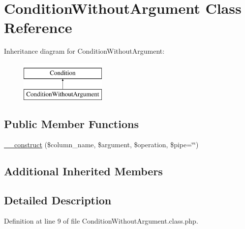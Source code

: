 \hypertarget{classConditionWithoutArgument}{\section{Condition\-Without\-Argument Class Reference}
\label{classConditionWithoutArgument}
}
Inheritance diagram for Condition\-Without\-Argument\-:\begin{figure}[H]
\begin{center}
\leavevmode
\includegraphics[height=2.000000cm]{classConditionWithoutArgument}
\end{center}
\end{figure}
\subsection*{Public Member Functions}
\begin{DoxyCompactItemize}
\item 
\hyperlink{classConditionWithoutArgument_a4e97757ce87f11f6d5135054712943b3}{\-\_\-\-\_\-construct} (\$column\-\_\-name, \$argument, \$operation, \$pipe=\char`\"{}\char`\"{})
\end{DoxyCompactItemize}
\subsection*{Additional Inherited Members}


\subsection{Detailed Description}


Definition at line 9 of file Condition\-Without\-Argument.\-class.\-php.



